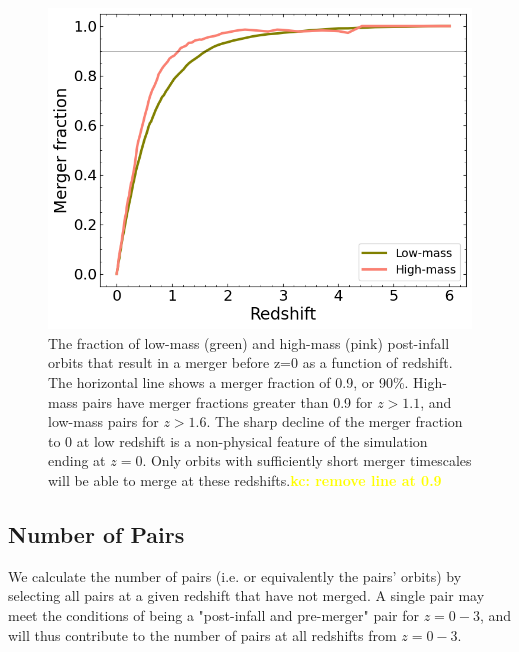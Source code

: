 \documentclass[twocolumn,linenumbers]{aastex631}
\newcommand{\kc}[1]{\textcolor{yellow}{\textbf{kc: #1}} }
\begin{document}
\begin{figure}[htb]
    \begin{center}
    \includegraphics[width=\columnwidth]{plots/bet-on-it/6_mergerfraction.png}
    \caption{The fraction of low-mass (green) and high-mass (pink) post-infall orbits that result in a merger before z=0 as a function of redshift. 
    The horizontal line shows a merger fraction of 0.9, or 90\%. 
    High-mass pairs have merger fractions greater than 0.9 for $z>1.1$, and low-mass pairs for $z>1.6$.
    The sharp decline of the merger fraction to 0 at low redshift is a non-physical feature of the simulation ending at $z=0$.
    Only orbits with sufficiently short merger timescales will be able to merge at these redshifts.\kc{remove line at 0.9}}
    \label{fig:fmerge}
    \end{center}
\end{figure}

\subsection{Number of Pairs}
We calculate the number of pairs (i.e. or equivalently the pairs' orbits) by selecting all pairs at a given redshift that have not merged.
A single pair may meet the conditions of being a "post-infall and pre-merger" pair for $z=0-3$, and will thus contribute to the number of pairs at all redshifts from $z=0-3$. 
\end{document}
